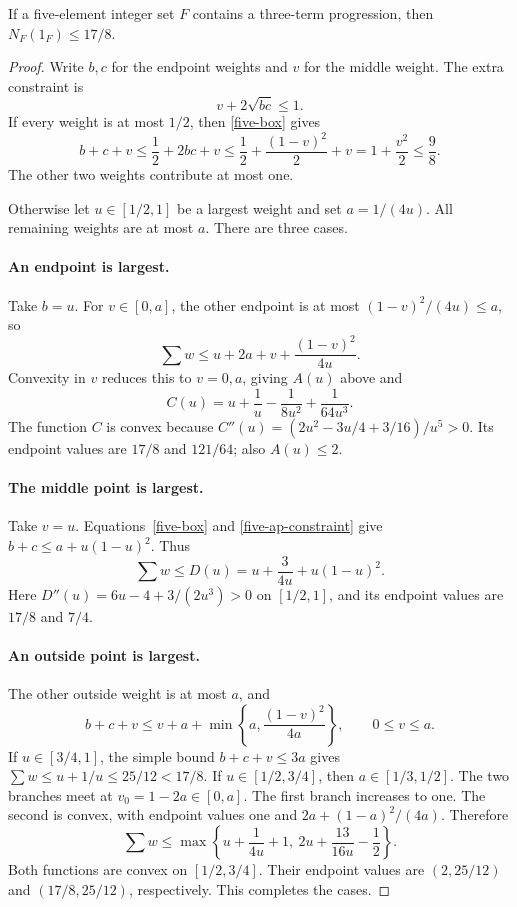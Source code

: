\begin{lemma}\label{five-progression}
If a five-element integer set $F$ contains a three-term progression,
then $N_F(1_F)\le17/8$.
\end{lemma}
\begin{proof}
Write $b,c$ for the endpoint weights and $v$ for the middle weight.
The extra constraint is
\begin{equation}\label{five-ap-constraint}
 v+2\sqrt{bc}\le1.
\end{equation}
If every weight is at most $1/2$, then \eqref{five-box} gives
\[
 b+c+v\le\frac12+2bc+v
 \le\frac12+\frac{(1-v)^2}{2}+v
 =1+\frac{v^2}{2}\le\frac98.
\]
The other two weights contribute at most one.

Otherwise let $u\in[1/2,1]$ be a largest weight and set $a=1/(4u)$.
All remaining weights are at most $a$. There are three cases.

\paragraph{An endpoint is largest.}
Take $b=u$. For $v\in[0,a]$, the other endpoint is at most
$(1-v)^2/(4u)\le a$, so
\[
 \sum w\le u+2a+v+\frac{(1-v)^2}{4u}.
\]
Convexity in $v$ reduces this to $v=0,a$, giving $A(u)$ above and
\[
 C(u)=u+\frac1u-\frac1{8u^2}+\frac1{64u^3}.
\]
The function $C$ is convex because
$C''(u)=(2u^2-3u/4+3/16)/u^5>0$.
Its endpoint values are $17/8$ and $121/64$; also $A(u)\le2$.

\paragraph{The middle point is largest.}
Take $v=u$. Equations~\eqref{five-box} and \eqref{five-ap-constraint}
give $b+c\le a+u(1-u)^2$. Thus
\[
 \sum w\le D(u)=u+\frac{3}{4u}+u(1-u)^2.
\]
Here $D''(u)=6u-4+3/(2u^3)>0$ on $[1/2,1]$, and its endpoint
values are $17/8$ and $7/4$.

\paragraph{An outside point is largest.}
The other outside weight is at most $a$, and
\[
 b+c+v\le v+a+\min\left\{a,\frac{(1-v)^2}{4a}\right\},
 \qquad 0\le v\le a.
\]
If $u\in[3/4,1]$, the simple bound $b+c+v\le3a$ gives
$\sum w\le u+1/u\le25/12<17/8$.
If $u\in[1/2,3/4]$, then $a\in[1/3,1/2]$. The two branches
meet at $v_0=1-2a\in[0,a]$. The first branch increases to one.
The second is convex, with endpoint values one and
$2a+(1-a)^2/(4a)$. Therefore
\[
 \sum w\le\max\left\{u+\frac1{4u}+1,\
                       2u+\frac{13}{16u}-\frac12\right\}.
\]
Both functions are convex on $[1/2,3/4]$. Their endpoint values are
$(2,25/12)$ and $(17/8,25/12)$, respectively. This completes the cases.
\end{proof}

